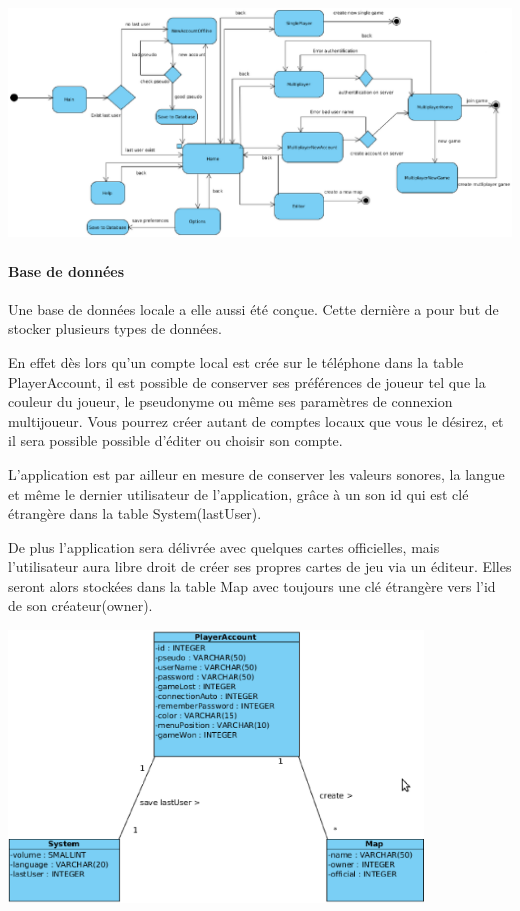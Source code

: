 	\begin{center}
		\label{activité}
		\includegraphics[width=23cm, angle=90]{Analyse/Img/diag_activity.eps}
	\end{center}

	\paragraph{Base de données\\}
			
		Une base de données locale a elle aussi été conçue. Cette dernière a pour
		but de stocker plusieurs types de données.
				
		En effet dès lors qu'un compte local est crée sur le téléphone dans la
		table PlayerAccount, il est possible de conserver ses préférences de joueur
		tel que la couleur du joueur, le pseudonyme ou même ses paramètres de connexion multijoueur. 
		Vous pourrez créer autant de comptes locaux que vous le désirez, et il
		sera possible possible d'éditer ou choisir son compte.
				
		L'application est par ailleur en mesure de conserver
		les valeurs sonores, la langue et même le dernier utilisateur de
		l'application, grâce à un son id qui est clé étrangère dans la table System(lastUser).
				
		De plus l'application sera délivrée avec quelques cartes officielles, mais
		l'utilisateur aura libre droit de créer ses propres cartes de jeu via un
		éditeur. Elles seront alors stockées dans la table Map avec toujours une
		clé étrangère vers l'id de son créateur(owner). \\
				
		\begin{center}
			\includegraphics[width=11cm]{./Analyse/Img/menu_bdd.eps}
		\end{center}
						
